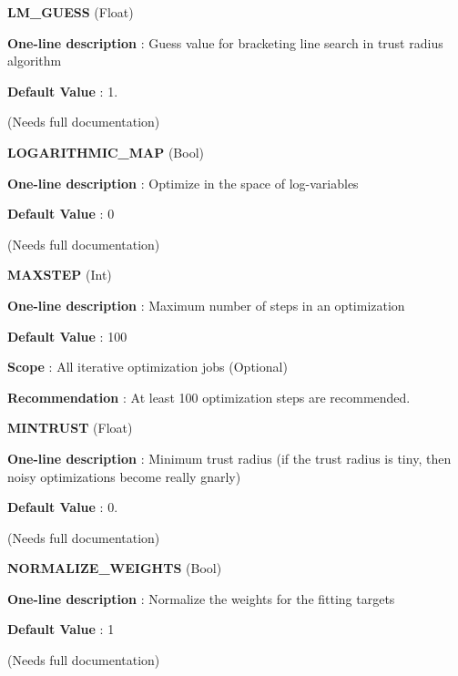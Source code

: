 \begin{DoxyItemize}
\item {\bfseries  L\-M\-\_\-\-G\-U\-E\-S\-S } (Float) \par
{\bfseries  One-\/line description }\-: Guess value for bracketing line search in trust radius algorithm \par
{\bfseries  Default Value }\-: 1. \par
(Needs full documentation)\end{DoxyItemize}
\begin{DoxyItemize}
\item {\bfseries  L\-O\-G\-A\-R\-I\-T\-H\-M\-I\-C\-\_\-\-M\-A\-P } (Bool) \par
{\bfseries  One-\/line description }\-: Optimize in the space of log-\/variables \par
{\bfseries  Default Value }\-: 0 \par
(Needs full documentation)\end{DoxyItemize}
\begin{DoxyItemize}
\item {\bfseries  M\-A\-X\-S\-T\-E\-P } (Int) \par
{\bfseries  One-\/line description }\-: Maximum number of steps in an optimization \par
{\bfseries  Default Value }\-: 100 \par
{\bfseries  Scope }\-: All iterative optimization jobs (Optional) \par
{\bfseries  Recommendation }\-: At least 100 optimization steps are recommended.\end{DoxyItemize}
\begin{DoxyItemize}
\item {\bfseries  M\-I\-N\-T\-R\-U\-S\-T } (Float) \par
{\bfseries  One-\/line description }\-: Minimum trust radius (if the trust radius is tiny, then noisy optimizations become really gnarly) \par
{\bfseries  Default Value }\-: 0. \par
(Needs full documentation)\end{DoxyItemize}
\begin{DoxyItemize}
\item {\bfseries  N\-O\-R\-M\-A\-L\-I\-Z\-E\-\_\-\-W\-E\-I\-G\-H\-T\-S } (Bool) \par
{\bfseries  One-\/line description }\-: Normalize the weights for the fitting targets \par
{\bfseries  Default Value }\-: 1 \par
(Needs full documentation)\end{DoxyItemize}
